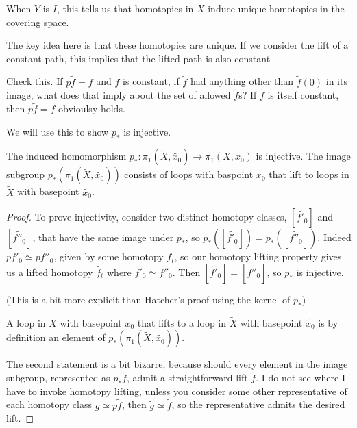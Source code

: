 \documentclass[10pt]{article}
\begin{document}
When $Y$ is $I$, this tells us that homotopies in $X$ induce unique homotopies
in the covering space.

The key idea here is that these homotopies are unique. If we consider the lift
of a constant path, this implies that the lifted path is also constant 

\begin{note}
Check this. If $p\tilde{f} = f$ and $f$ is constant, if $\tilde{f}$ had anything
other than $\tilde{f}(0)$ in its image, what does that imply about the set of
allowed $\tilde{f}$s? If $\tilde{f}$ is itself constant, then $p\tilde{f} = f$
obvioulsy holds. 
\end{note}

We will use this to show $p_*$ is injective.

\begin{proposition}
	The induced homomorphism $p_*: \pi_1(\tilde{X}, \tilde{x_0}) \to \pi_1(X,
	x_0)$ is injective. The image subgroup $p_*(\pi_1(\tilde{X}, \tilde{x_0}))$
	consists of loops with baspoint $x_0$ that lift to loops in $\tilde{X}$ with
	basepoint $\tilde{x_0}$.
\end{proposition}

\begin{proof}
	To prove injectivity, consider two distinct homotopy classes, $[\tilde{f'_0}]$
	and $[\tilde{f''_0}]$, that have the same image under $p_*$, so
	$p_*([\tilde{f'_0}]) = p_*([\tilde{f''_0}])$. Indeed $p\tilde{f'_0} \simeq
	p\tilde{f''_0}$, given by some homotopy $f_t$, so our homotopy lifting
	property gives us a lifted homotopy $\tilde{f_t}$ where $\tilde{f'_0} \simeq
	\tilde{f''_0}$. Then $[\tilde{f'_0}] = [\tilde{f''_0}]$, so $p_*$ is
	injective.

	(This is a bit more explicit than Hatcher's proof using the kernel of $p_*$)

	A loop in $X$ with basepoint $x_0$ that lifts to a loop in $\tilde{X}$ with
	basepoint $\tilde{x_0}$ is by definition an element of $p_*(\pi_1(\tilde{X},
	\tilde{x_0}))$.

	The second statement is a bit bizarre, because should every element in the
	image subgroup, represented as $p_*\tilde{f}$, admit a straightforward lift
	$\tilde{f}$. I do not see where I have to invoke homotopy lifting, unless you
	consider some other representative of each homotopy class $g \simeq
	p\tilde{f}$, then $\tilde{g} \simeq \tilde{f}$, so the representative admits
	the desired lift.
\end{proof}
\end{document}
